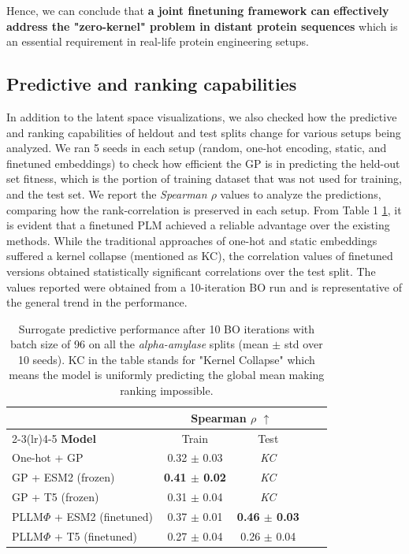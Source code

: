 \documentclass{article}
\theoremstyle{plain}
\theoremstyle{definition}
\theoremstyle{remark}
\begin{document}
Hence, we can conclude that \textbf{a joint finetuning framework can} \textbf{effectively address the "zero-kernel" problem in distant protein sequences} which is an essential requirement in real-life protein engineering setups.

\subsection{Predictive and ranking capabilities}
In addition to the latent space visualizations, we also checked how the predictive and ranking capabilities of heldout and test splits change for various setups being analyzed. We ran 5 seeds in each setup (random, one-hot encoding, static, and finetuned embeddings) to check how efficient the GP is in predicting the held-out set fitness, which is the portion of training dataset that was not used for training, and the test set. We report the \textit{Spearman $\rho$} values to analyze the predictions, comparing how the rank-correlation is preserved in each setup. From Table 1 \ref{tab:surrogate_predictive}, it is evident that a finetuned PLM achieved a reliable advantage over the existing methods. While the traditional approaches of one-hot and static embeddings suffered a kernel collapse (mentioned as KC), the correlation values of finetuned versions obtained statistically significant correlations over the test split. The values reported were obtained from a 10-iteration BO run and is representative of the general trend in the performance. 

\begin{table}[t]
\centering
\caption{Surrogate predictive performance after 10 BO iterations with batch size of 96 on all the \textit{alpha-amylase} splits (mean $\pm$ std over 10 seeds). KC in the table stands for "Kernel Collapse" which means the model is uniformly predicting the global mean making ranking impossible.}
\label{tab:surrogate_predictive}
\setlength{\tabcolsep}{5pt}
\begin{tabular}{lcccc}
\toprule
& \multicolumn{2}{c}{Spearman $\rho$ $\uparrow$} \\
\cmidrule(lr){2-3}\cmidrule(lr){4-5}
\textbf{Model} & Train & Test \\
\midrule
One-hot + GP
  & 0.32 $\pm$ 0.03& \textit{KC} \\
GP + ESM2 (frozen)
  & \textbf{0.41 $\pm$ 0.02}  & \textit{KC} \\
GP + T5 (frozen)
  & 0.31 $\pm$ 0.04 & \textit{KC} \\
PLLM$\Phi$ + ESM2 (finetuned)
  & 0.37 $\pm$ 0.01 & \textbf{0.46 $\pm$ 0.03}\\
PLLM$\Phi$ + T5 (finetuned)
  & 0.27 $\pm$ 0.04 & 0.26 $\pm$ 0.04\\
\bottomrule
\end{tabular}
\end{table}
\end{document}
